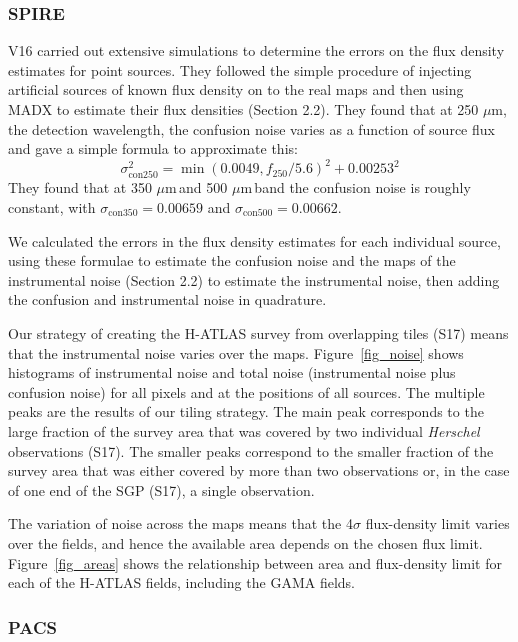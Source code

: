 \documentclass[useAMS,usenatbib]{mnras}
\def\mic{ $\mu $m\,}
\begin{document}
\subsubsection{SPIRE}

V16 carried out extensive simulations to determine the
errors on the flux density estimates for point sources.
They followed the simple procedure of injecting artificial
sources of known flux density on to the real maps and then
using MADX to estimate their flux densities
(Section 2.2).  
They found that at 250 $\mu$m, the detection
wavelength, the confusion noise varies as a function
of source flux and gave a simple formula to approximate this:
\smallskip
\begin{equation}
\sigma_{\mathrm{con}250}^2 = \min(0.0049,f_{250}/5.6)^2 + 0.00253^2
\end{equation}
\smallskip
\noindent They found that
at 350\mic and 500\mic band the confusion noise 
is roughly constant, with $\sigma_{\mathrm{con}350} = 0.00659$ and
$\sigma_{\mathrm{con}500} = 0.00662$.

We calculated the errors in the flux density estimates for each
individual source, using these formulae to estimate the confusion
noise and the maps of the instrumental noise (Section 2.2) to estimate
the instrumental noise, then adding the confusion and instrumental
noise in quadrature.


Our strategy of creating the H-ATLAS survey from overlapping tiles
(S17) means that the instrumental noise varies over the maps.
Figure~\ref{fig_noise} shows histograms of instrumental noise and
total noise (instrumental noise plus confusion noise) for all pixels
and at the positions of all sources.  The multiple peaks are the
results of our tiling strategy. The main peak corresponds to the large
fraction of the survey area that was covered by two individual {\it
  Herschel} observations (S17). The smaller peaks correspond to the
smaller fraction of the survey area that was either covered by more
than two observations or, in the case of one end of the SGP (S17), a
single observation.

The variation of noise across the maps means that the 4$\sigma$
flux-density limit varies over the fields, and hence the available
area depends on the chosen flux limit. Figure~\ref{fig_areas}
shows the relationship between area and flux-density limit for each of
the H-ATLAS fields, including the GAMA fields.



\subsubsection{PACS}
\end{document}
